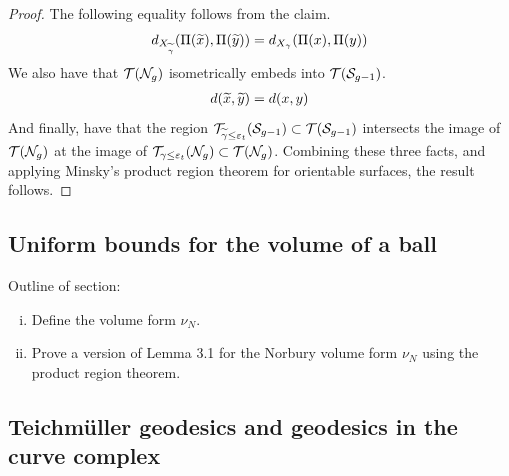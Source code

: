\documentclass[12pt, reqno]{amsart}
\begin{document}
\begin{proof}
  The following equality follows from the claim.
  \begin{align*}
    d_{X_{\widetilde{\gamma}}}(\Pi(\widetilde{x}), \Pi(\widetilde{y})) = d_{X_{{\gamma}}}(\Pi({x}), \Pi({y}))
  \end{align*}
  We also have that $\mathcal{T}(\mathcal{N}_g)$ isometrically embeds into $\mathcal{T}(\mathcal{S}_{g-1})$.
  \begin{align*}
    d(\widetilde{x}, \widetilde{y}) = d(x, y)
  \end{align*}
  And finally, have that the region $\mathcal{T}_{\widetilde{\gamma} \leq \varepsilon_t}(\mathcal{S}_{g-1}) \subset \mathcal{T}(\mathcal{S}_{g-1})$ intersects the image of $\mathcal{T}(\mathcal{N}_g)$ at the image of $\mathcal{T}_{\gamma \leq \varepsilon_t}(\mathcal{N}_g) \subset \mathcal{T}(\mathcal{N}_g)$.
  Combining these three facts, and applying Minsky's product region theorem for orientable surfaces, the result follows.
\end{proof}


\subsection{Uniform bounds for the volume of a ball}
\label{sec:unif-bounds-volume}

Outline of section:
\begin{enumerate}[(i)]
\item Define the volume form $\nu_N$.
\item {\color{red} Prove a version of Lemma 3.1 for the Norbury volume form $\nu_N$ using the product region theorem.}
\end{enumerate}



\subsection{Teichmüller geodesics and geodesics in the curve complex}
\label{sec:dist-form-teichm}
\end{document}
